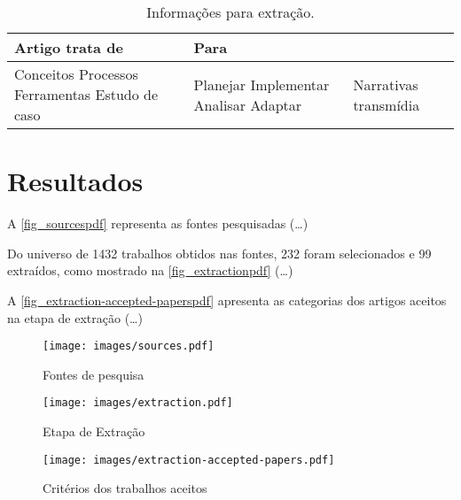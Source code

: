 \documentclass[
article,			%
11pt,				%
oneside,			%
a4paper,			%
english,			%
brazil,				%
sumario=tradicional
]{abntex2}
\begin{document}
  \begin{table}[htb]
    \ABNTEXfontereduzida
    \caption[Informações para extração]{Informações para extração.}
    \label{tab-topicos-objetivos}
    \begin{tabular}{p{5.0cm}|p{4.1cm}|p{4.0cm}}
      \textbf{Artigo trata de} & \textbf{Para} &  \\
      \hline
      Conceitos \newline Processos \newline Ferramentas \newline Estudo de caso & Planejar \newline Implementar \newline Analisar \newline Adaptar & Narrativas transmídia \\
    \end{tabular}
  \end{table}

  \section{Resultados}

  A \autoref{fig_sourcespdf} representa as fontes pesquisadas (\ldots)

  Do universo de 1432 trabalhos obtidos nas fontes, 232 foram selecionados e 99 extraídos, como mostrado na \autoref{fig_extractionpdf} (\ldots)

  A \autoref{fig_extraction-accepted-paperspdf} apresenta as categorias dos artigos aceitos na etapa de extração (\ldots)

  \begin{figure}[htb]
    \caption{\label{fig_sourcespdf}Fontes de pesquisa}
    \begin{center}
      \texttt{[image: images/sources.pdf]}
    \end{center}
  \end{figure}

  \begin{figure}[htb]
    \caption{\label{fig_extractionpdf}Etapa de Extração}
    \begin{center}
      \texttt{[image: images/extraction.pdf]}
    \end{center}
  \end{figure}

  \begin{figure}[htb]
    \caption{\label{fig_extraction-accepted-paperspdf}Critérios dos trabalhos aceitos}
    \begin{center}
      \texttt{[image: images/extraction-accepted-papers.pdf]}
    \end{center}
  \end{figure}
\end{document}
